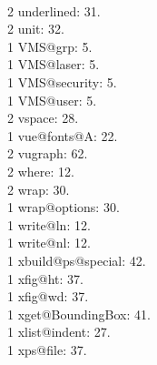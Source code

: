 \\2 underlined: 31.
\\2 unit: 32.
\\1 VMS@grp: 5.
\\1 VMS@laser: 5.
\\1 VMS@security: 5.
\\1 VMS@user: 5.
\\2 vspace: 28.
\\1 vue@fonts@A: 22.
\\2 vugraph: 62.
\\2 where: 12.
\\2 wrap: 30.
\\1 wrap@options: 30.
\\1 write@ln: 12.
\\1 write@nl: 12.
\\1 xbuild@ps@special: 42.
\\1 xfig@ht: 37.
\\1 xfig@wd: 37.
\\1 xget@BoundingBox: 41.
\\1 xlist@indent: 27.
\\1 xps@file: 37.

\noprivatize

